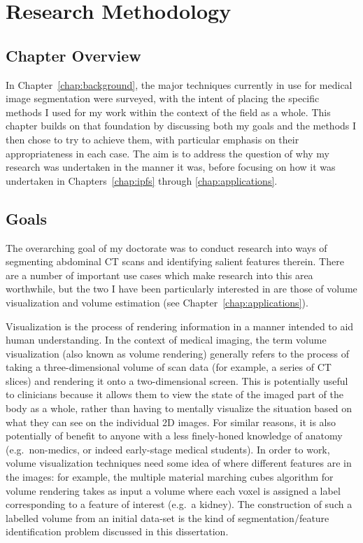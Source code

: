 \chapter{Research Methodology}
\label{chap:methodology}

\section{Chapter Overview}

In Chapter~\ref{chap:background}, the major techniques currently in use for medical image segmentation were surveyed, with the intent of placing the specific methods I used for my work within the context of the field as a whole. This chapter builds on that foundation by discussing both my goals and the methods I then chose to try to achieve them, with particular emphasis on their appropriateness in each case. The aim is to address the question of why my research was undertaken in the manner it was, before focusing on how it was undertaken in Chapters~\ref{chap:ipfs} through \ref{chap:applications}.

\section{Goals}

The overarching goal of my doctorate was to conduct research into ways of segmenting abdominal CT scans and identifying salient features therein. There are a number of important use cases which make research into this area worthwhile, but the two I have been particularly interested in are those of volume visualization and volume estimation (see Chapter~\ref{chap:applications}).

Visualization is the process of rendering information in a manner intended to aid human understanding. In the context of medical imaging, the term volume visualization (also known as volume rendering) generally refers to the process of taking a three-dimensional volume of scan data (for example, a series of CT slices) and rendering it onto a two-dimensional screen. This is potentially useful to clinicians because it allows them to view the state of the imaged part of the body as a whole, rather than having to mentally visualize the situation based on what they can see on the individual 2D images. For similar reasons, it is also potentially of benefit to anyone with a less finely-honed knowledge of anatomy (e.g.~non-medics, or indeed early-stage medical students). In order to work, volume visualization techniques need some idea of where different features are in the images: for example, the multiple material marching cubes algorithm \cite{wu03} for volume rendering takes as input a volume where each voxel is assigned a label corresponding to a feature of interest (e.g.~a kidney). The construction of such a labelled volume from an initial data-set is the kind of segmentation/feature identification problem discussed in this dissertation.

